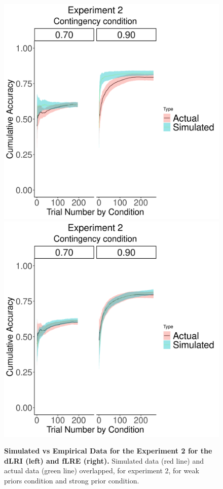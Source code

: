\documentclass[a4paper,12pt]{article}
\begin{document}
\begin{figure}[ht!]
{\includegraphics{figures/SimulatedVsActual.exp=exp2.mod=dLR_Instr.png}} \vfill
{\includegraphics{figures/SimulatedVsActual.exp=exp2.mod=fLR_Eval.png}}
\caption{\textbf{Simulated vs Empirical Data for the Experiment 2 for the dLRI  (left) and fLRE (right).} Simulated data (red line) and actual data (green line) overlapped, for experiment 2, for weak priors condition and strong prior condition. }
\label{fig:simvsemp_dlr_flrI_exp2}
\end{figure}
\end{document}
